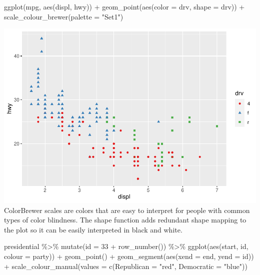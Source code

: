 \documentclass[
]{article}
\newenvironment{Shaded}{\begin{snugshade}}{\end{snugshade}}
\newcommand{\AttributeTok}[1]{\textcolor[rgb]{0.77,0.63,0.00}{#1}}
\newcommand{\DecValTok}[1]{\textcolor[rgb]{0.00,0.00,0.81}{#1}}
\newcommand{\FunctionTok}[1]{\textcolor[rgb]{0.00,0.00,0.00}{#1}}
\newcommand{\NormalTok}[1]{#1}
\newcommand{\SpecialCharTok}[1]{\textcolor[rgb]{0.00,0.00,0.00}{#1}}
\newcommand{\StringTok}[1]{\textcolor[rgb]{0.31,0.60,0.02}{#1}}
\begin{document}
\begin{Shaded}
\begin{Highlighting}[]
\FunctionTok{ggplot}\NormalTok{(mpg, }\FunctionTok{aes}\NormalTok{(displ, hwy)) }\SpecialCharTok{+}
  \FunctionTok{geom\_point}\NormalTok{(}\FunctionTok{aes}\NormalTok{(}\AttributeTok{color =}\NormalTok{ drv, }\AttributeTok{shape =}\NormalTok{ drv)) }\SpecialCharTok{+}
  \FunctionTok{scale\_colour\_brewer}\NormalTok{(}\AttributeTok{palette =} \StringTok{"Set1"}\NormalTok{)}
\end{Highlighting}
\end{Shaded}

\includegraphics{Assignments_files/figure-latex/unnamed-chunk-67-2.pdf}
ColorBrewer scales are colors that are easy to interpret for people with
common types of color blindness. The shape function adds redundant shape
mapping to the plot so it can be easily interpreted in black and white.

\begin{Shaded}
\begin{Highlighting}[]
\NormalTok{presidential }\SpecialCharTok{\%\textgreater{}\%}
  \FunctionTok{mutate}\NormalTok{(}\AttributeTok{id =} \DecValTok{33} \SpecialCharTok{+} \FunctionTok{row\_number}\NormalTok{()) }\SpecialCharTok{\%\textgreater{}\%}
  \FunctionTok{ggplot}\NormalTok{(}\FunctionTok{aes}\NormalTok{(start, id, }\AttributeTok{colour =}\NormalTok{ party)) }\SpecialCharTok{+}
    \FunctionTok{geom\_point}\NormalTok{() }\SpecialCharTok{+}
    \FunctionTok{geom\_segment}\NormalTok{(}\FunctionTok{aes}\NormalTok{(}\AttributeTok{xend =}\NormalTok{ end, }\AttributeTok{yend =}\NormalTok{ id)) }\SpecialCharTok{+}
    \FunctionTok{scale\_colour\_manual}\NormalTok{(}\AttributeTok{values =} \FunctionTok{c}\NormalTok{(}\AttributeTok{Republican =} \StringTok{"red"}\NormalTok{, }\AttributeTok{Democratic =} \StringTok{"blue"}\NormalTok{))}
\end{Highlighting}
\end{Shaded}
\end{document}
